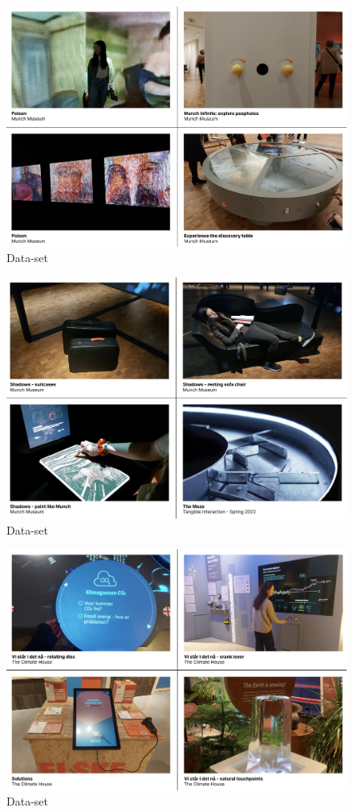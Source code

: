 \begin{figure}[H]
\includegraphics[width=13cm]{pictures/dataset/munch_2.png}
\centering 
\caption{Data-set}
\end{figure}

\begin{figure}[H]
\includegraphics[width=13cm]{pictures/dataset/munch_3.png}
\centering 
\caption{Data-set}
\end{figure}

\begin{figure}[H]
\includegraphics[width=13cm]{pictures/dataset/klimahuset.png}
\centering 
\caption{Data-set}
\end{figure}

